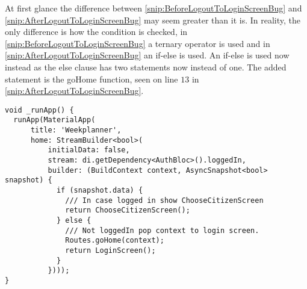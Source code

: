 At first glance the difference between \autoref{snip:BeforeLogoutToLoginScreenBug} and \autoref{snip:AfterLogoutToLoginScreenBug} may seem greater than it is.
In reality, the only difference is how the condition is checked, in \autoref{snip:BeforeLogoutToLoginScreenBug} a ternary operator is used and in \autoref{snip:AfterLogoutToLoginScreenBug} an if-else is used.
An if-else is used now instead as the else clause has two statements now instead of one.
The added statement is the goHome function, seen on line $13$ in \autoref{snip:AfterLogoutToLoginScreenBug}.

\begin{lstlisting}[label={snip:AfterLogoutToLoginScreenBug}, caption={The \_runApp function after the bug fix(notice the call to the goHome function)}, captionpos=b, language=CSharp] 
void _runApp() {
  runApp(MaterialApp(
      title: 'Weekplanner',
      home: StreamBuilder<bool>(
          initialData: false,
          stream: di.getDependency<AuthBloc>().loggedIn,
          builder: (BuildContext context, AsyncSnapshot<bool> snapshot) {
            if (snapshot.data) {
              /// In case logged in show ChooseCitizenScreen
              return ChooseCitizenScreen();
            } else {
              /// Not loggedIn pop context to login screen.
              Routes.goHome(context);
              return LoginScreen();
            }
          })));
}
\end{lstlisting}
